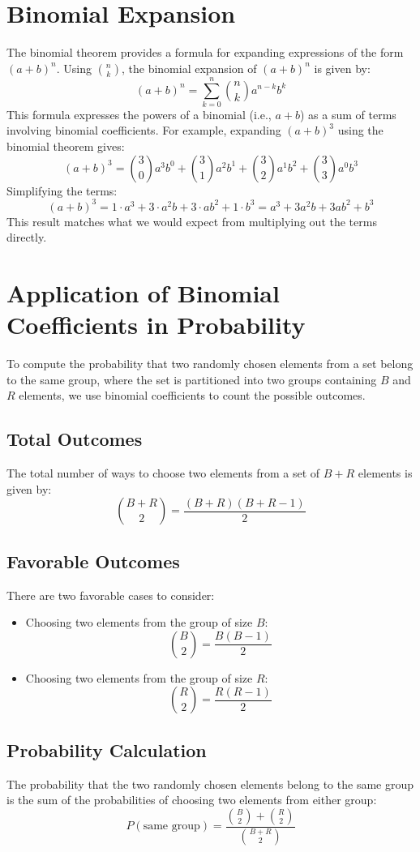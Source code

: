 \documentclass[10pt]{article}
\theoremstyle{plain}
\theoremstyle{definition}
\theoremstyle{remark}
\begin{document}
\section{Binomial Expansion}
The binomial theorem provides a formula for expanding expressions of the form \( (a + b)^n \). Using \( n \choose k \), the binomial expansion of \( (a + b)^n \) is given by:
\[
(a + b)^n = \sum_{k=0}^{n} \binom{n}{k} a^{n-k} b^k
\]
This formula expresses the powers of a binomial (i.e., \( a + b \)) as a sum of terms involving binomial coefficients. For example, expanding \( (a + b)^3 \) using the binomial theorem gives:
\[
(a + b)^3 = \binom{3}{0} a^3 b^0 + \binom{3}{1} a^2 b^1 + \binom{3}{2} a^1 b^2 + \binom{3}{3} a^0 b^3
\]
Simplifying the terms:
\[
(a + b)^3 = 1 \cdot a^3 + 3 \cdot a^2b + 3 \cdot ab^2 + 1 \cdot b^3 = a^3 + 3a^2b + 3ab^2 + b^3
\]
This result matches what we would expect from multiplying out the terms directly.

\section{Application of Binomial Coefficients in Probability}

To compute the probability that two randomly chosen elements from a set belong to the same group, where the set is partitioned into two groups containing $B$ and $R$ elements, we use binomial coefficients to count the possible outcomes.

\subsection{Total Outcomes}
The total number of ways to choose two elements from a set of $B + R$ elements is given by:
\[
\binom{B + R}{2} = \frac{(B + R)(B + R - 1)}{2}
\]

\subsection{Favorable Outcomes}
There are two favorable cases to consider:
\begin{itemize}
    \item Choosing two elements from the group of size $B$:
    \[
    \binom{B}{2} = \frac{B(B - 1)}{2}
    \]
    \item Choosing two elements from the group of size $R$:
    \[
    \binom{R}{2} = \frac{R(R - 1)}{2}
    \]
\end{itemize}

\subsection{Probability Calculation}
The probability that the two randomly chosen elements belong to the same group is the sum of the probabilities of choosing two elements from either group:
\[
P(\text{same group}) = \frac{\binom{B}{2} + \binom{R}{2}}{\binom{B + R}{2}}
\]
\end{document}
